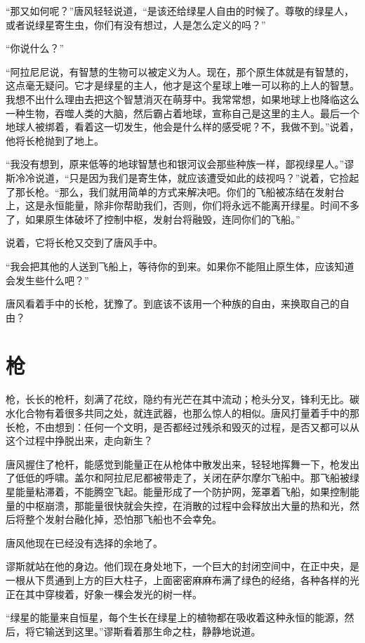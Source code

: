“那又如何呢？”唐风轻轻说道，“是该还给绿星人自由的时候了。尊敬的绿星人，或者说绿星寄生虫，你们有没有想过，人是怎么定义的吗？”

“你说什么？”

“阿拉尼尼说，有智慧的生物可以被定义为人。现在，那个原生体就是有智慧的，这点毫无疑问。它才是绿星的主人，他才是这个星球上唯一可以称的上人的智慧。我想不出什么理由去把这个智慧消灭在萌芽中。我常常想，如果地球上也降临这么一种生物，吞噬人类的大脑，然后霸占着地球，宣称自己是这里的主人。最后一个地球人被绑着，看着这一切发生，他会是什么样的感受呢？不，我做不到。”说着，他将长枪抛到了地上。

“我没有想到，原来低等的地球智慧也和银河议会那些种族一样，鄙视绿星人。”谬斯冷冷说道，“只是因为我们是寄生体，就应该遭受如此的歧视吗？”说着，它捡起了那长枪。“那么，我们就用简单的方式来解决吧。你们的飞船被冻结在发射台上，这是永恒能量，除非你帮助我们，否则，你们将永远不能离开绿星。时间不多了，如果原生体破坏了控制中枢，发射台将融毁，连同你们的飞船。”

说着，它将长枪又交到了唐风手中。

“我会把其他的人送到飞船上，等待你的到来。如果你不能阻止原生体，应该知道会发生些什么吧？”

唐风看着手中的长枪，犹豫了。到底该不该用一个种族的自由，来换取自己的自由？

\chapter{枪}

枪，长长的枪杆，刻满了花纹，隐约有光芒在其中流动；枪头分叉，锋利无比。碳水化合物有着很多共同之处，就连武器，也那么惊人的相似。唐风打量着手中的那长枪，不由想到：任何一个文明，是否都经过残杀和毁灭的过程，是否又都可以从这个过程中挣脱出来，走向新生？

唐风握住了枪杆，能感觉到能量正在从枪体中散发出来，轻轻地挥舞一下，枪发出了低低的呼啸。盖尔和阿拉尼尼都被带走了，关闭在萨尔摩尔飞船中。那飞船被绿星能量粘滞着，不能腾空飞起。能量形成了一个防护网，笼罩着飞船，如果控制能量的中枢崩溃，那能量很快就会失控，在消散的过程中会释放出大量的热和光，然后将整个发射台融化掉，恐怕那飞船也不会幸免。

唐风他现在已经没有选择的余地了。

谬斯就站在他的身边。他们现在身处地下，一个巨大的封闭空间中，在正中央，是一根从下贯通到上方的巨大柱子，上面密密麻麻布满了绿色的经络，各种各样的光正在其中穿梭着，好象一棵会发光的树一样。

“绿星的能量来自恒星，每个生长在绿星上的植物都在吸收着这种永恒的能源，然后，将它输送到这里。”谬斯看着那生命之柱，静静地说道。

